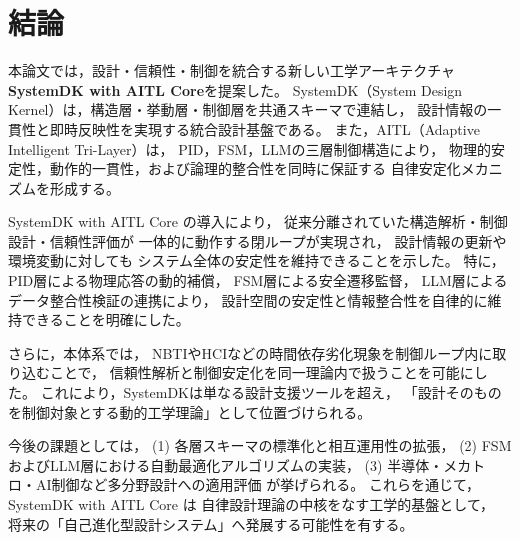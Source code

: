 \section{結論}

本論文では，設計・信頼性・制御を統合する新しい工学アーキテクチャ
\textbf{SystemDK with AITL Core}を提案した。
SystemDK（System Design Kernel）は，構造層・挙動層・制御層を共通スキーマで連結し，
設計情報の一貫性と即時反映性を実現する統合設計基盤である。
また，AITL（Adaptive Intelligent Tri-Layer）は，
PID，FSM，LLMの三層制御構造により，
物理的安定性，動作的一貫性，および論理的整合性を同時に保証する
自律安定化メカニズムを形成する。

SystemDK with AITL Core の導入により，
従来分離されていた構造解析・制御設計・信頼性評価が
一体的に動作する閉ループが実現され，
設計情報の更新や環境変動に対しても
システム全体の安定性を維持できることを示した。
特に，PID層による物理応答の動的補償，
FSM層による安全遷移監督，
LLM層によるデータ整合性検証の連携により，
設計空間の安定性と情報整合性を自律的に維持できることを明確にした。

さらに，本体系では，
NBTIやHCIなどの時間依存劣化現象を制御ループ内に取り込むことで，
信頼性解析と制御安定化を同一理論内で扱うことを可能にした。
これにより，SystemDKは単なる設計支援ツールを超え，
「設計そのものを制御対象とする動的工学理論」として位置づけられる。

今後の課題としては，
(1) 各層スキーマの標準化と相互運用性の拡張，  
(2) FSMおよびLLM層における自動最適化アルゴリズムの実装，  
(3) 半導体・メカトロ・AI制御など多分野設計への適用評価  
が挙げられる。
これらを通じて，SystemDK with AITL Core は
自律設計理論の中核をなす工学的基盤として，
将来の「自己進化型設計システム」へ発展する可能性を有する。
